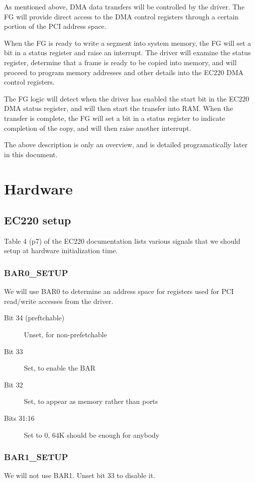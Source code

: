 \documentclass[12pt]{article}
\begin{document}
As mentioned above, DMA data transfers will be controlled by the driver. The FG will provide direct access to the DMA control registers through a certain portion of the PCI address space.

When the FG is ready to write a segment into system memory, the FG will set a bit in a status register and raise an interrupt. The driver will examine the status register, determine that a frame is ready to be copied into memory, and will proceed to program memory addresses and other details into the EC220 DMA control registers.

The FG logic will detect when the driver has enabled the start bit in the EC220 DMA status register, and will then start the transfer into RAM. When the transfer is complete, the FG will set a bit in a status register to indicate completion of the copy, and will then raise another interrupt.

The above description is only an overview, and is detailed programatically later in this document.

\section{Hardware}

\subsection{EC220 setup}

Table 4 (p7) of the EC220 documentation lists various signals that we should setup at hardware initialization time.

\subsubsection{BAR0\_SETUP}
We will use BAR0 to determine an address space for registers used for PCI read/write accesses from the driver.

\begin{description}
\item[Bit 34 (preftchable)] Unset, for non-prefetchable
\item[Bit 33] Set, to enable the BAR
\item[Bit 32] Set, to appear as memory rather than ports
\item[Bits 31:16] Set to 0, 64K should be enough for anybody
\end{description}

\subsubsection{BAR1\_SETUP}
We will not use BAR1. Unset bit 33 to disable it.
\end{document}

